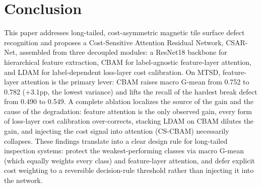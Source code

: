 \documentclass[a4paper,fleqn]{cas-sc}
\begin{document}
\begin{sloppypar}
	\section{Conclusion}
	\label{sec:conclusion}
	\par{
		This paper addresses long-tailed, cost-asymmetric magnetic tile surface defect recognition and proposes a Cost-Sensitive Attention Residual Network, CSAR-Net, assembled from three decoupled modules: a ResNet18 backbone for hierarchical feature extraction, CBAM for label-agnostic feature-layer attention, and LDAM for label-dependent loss-layer cost calibration. On MTSD, feature-layer attention is the primary lever: CBAM raises macro G-mean from 0.752 to 0.782 ($+$3.1pp, the lowest variance) and lifts the recall of the hardest break defect from 0.490 to 0.549. A complete ablation localizes the source of the gain and the cause of the degradation: feature attention is the only observed gain, every form of loss-layer cost calibration over-corrects, stacking LDAM on CBAM dilutes the gain, and injecting the cost signal into attention (CS-CBAM) necessarily collapses. These findings translate into a clear design rule for long-tailed inspection systems: protect the weakest-performing classes via macro G-mean (which equally weights every class) and feature-layer attention, and defer explicit cost weighting to a reversible decision-rule threshold rather than injecting it into the network.
	}

	\begin{table}[pos=htbp]
		\footnotesize
		\caption{Summary of findings and their design implications. Each finding maps to a concrete, transferable rule for long-tailed inspection systems.}
		\label{tbl:findings}
		\centering
	\end{table}


\end{sloppypar}
\end{document}
